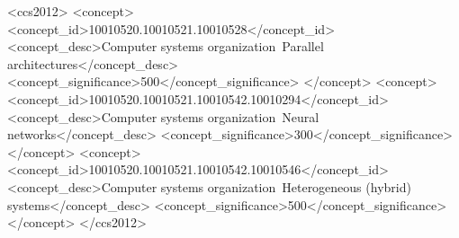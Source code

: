 \begin{CCSXML}
<ccs2012>
   <concept>
       <concept_id>10010520.10010521.10010528</concept_id>
       <concept_desc>Computer systems organization~Parallel architectures</concept_desc>
       <concept_significance>500</concept_significance>
       </concept>
   <concept>
       <concept_id>10010520.10010521.10010542.10010294</concept_id>
       <concept_desc>Computer systems organization~Neural networks</concept_desc>
       <concept_significance>300</concept_significance>
       </concept>
   <concept>
       <concept_id>10010520.10010521.10010542.10010546</concept_id>
       <concept_desc>Computer systems organization~Heterogeneous (hybrid) systems</concept_desc>
       <concept_significance>500</concept_significance>
       </concept>
 </ccs2012>
\end{CCSXML}


